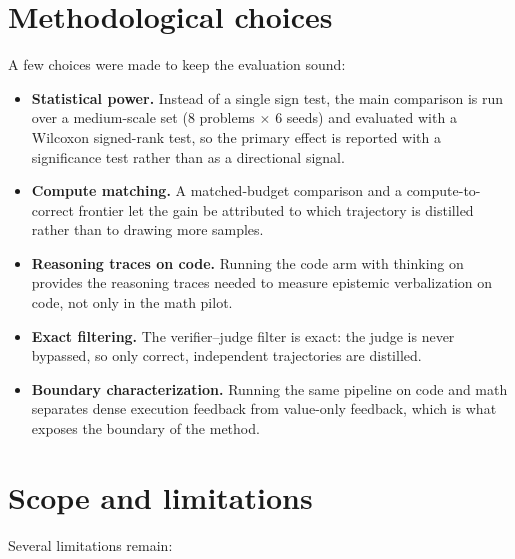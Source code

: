 \documentclass[12pt,a4paper]{report}
\providecommand{\tightlist}{\setlength{\itemsep}{0pt}\setlength{\parskip}{0pt}}
\begin{document}
\section{Methodological choices}\label{methodological-rigor-and-validations}

A few choices were made to keep the evaluation sound:

\begin{itemize}
\tightlist
\item
  \textbf{Statistical power.} Instead of a single sign test, the main comparison is run over a medium-scale set (8 problems $\times$ 6 seeds) and evaluated with a Wilcoxon signed-rank test, so the primary effect is reported with a significance test rather than as a directional signal.
\item
  \textbf{Compute matching.} A matched-budget comparison and a compute-to-correct frontier let the gain be attributed to which trajectory is distilled rather than to drawing more samples.
\item
  \textbf{Reasoning traces on code.} Running the code arm with thinking on provides the reasoning traces needed to measure epistemic verbalization on code, not only in the math pilot.
\item
  \textbf{Exact filtering.} The verifier--judge filter is exact: the judge is never bypassed, so only correct, independent trajectories are distilled.
\item
  \textbf{Boundary characterization.} Running the same pipeline on code and math separates dense execution feedback from value-only feedback, which is what exposes the boundary of the method.
\end{itemize}

\section{Scope and limitations}\label{scope-and-remaining-limitations}

Several limitations remain:
\end{document}
